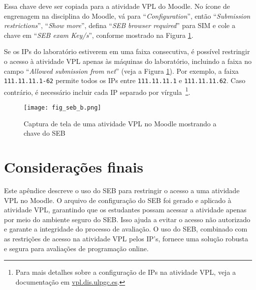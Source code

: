 Essa chave deve ser copiada para a atividade VPL do Moodle. No ícone de engrenagem na disciplina do Moodle, vá para ``\textit{Configuration}'', então ``\textit{Submission restrictions}'', ``\textit{Show more}'', defina ``\textit{SEB browser required}'' para SIM e cole a chave em ``\textit{SEB exam Key/s}'', conforme mostrado na Figura \ref{fig:fig_seb_b}.

Se os IPs do laboratório estiverem em uma faixa consecutiva, é possível restringir o acesso à atividade VPL apenas às máquinas do laboratório, incluindo a faixa no campo ``\textit{Allowed submission from net}'' (veja a Figura \ref{fig:fig_seb_b}). Por exemplo, a faixa \verb|111.11.11.1-62| permite todos os IPs entre \verb|111.11.11.1| e \verb|111.11.11.62|. Caso contrário, é necessário incluir cada IP separado por vírgula~\footnote{Para mais detalhes sobre a configuração de IPs na atividade VPL, veja a documentação em \href{https://vpl.dis.ulpgc.es}{vpl.dis.ulpgc.es}.}.

\begin{figure}[!ht]
\centering
\texttt{[image: fig\_seb\_b.png]}
\caption{Captura de tela de uma atividade VPL no Moodle mostrando a chave do SEB}
\label{fig:fig_seb_b}
\end{figure}


\section{Considerações finais}

Este apêndice descreve o uso do SEB para restringir o acesso a uma atividade VPL no Moodle. O arquivo de configuração do SEB foi gerado e aplicado à atividade VPL, garantindo que os estudantes possam acessar a atividade apenas por meio do ambiente seguro do SEB. Isso ajuda a evitar o acesso não autorizado e garante a integridade do processo de avaliação. O uso do SEB, combinado com as restrições de acesso na atividade VPL pelos IP's, fornece uma solução robusta e segura para avaliações de programação online.

